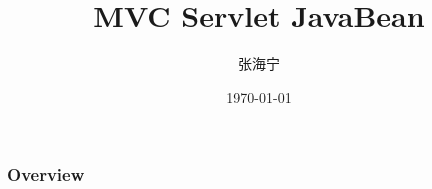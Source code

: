 \documentclass{beamer}
\title[mvc]{MVC Servlet JavaBean} %
\author{张海宁} %
\institute[gzu] %
{
贵州大学 \\ %
\medskip
\textit{hnzhang1@gzu.edu.cn} %
}
\date{\today} %
\begin{document}
\begin{frame}
\titlepage %
\end{frame}

\begin{frame}
\frametitle{Overview} %
\tableofcontents %
\end{frame}


\end{document}
